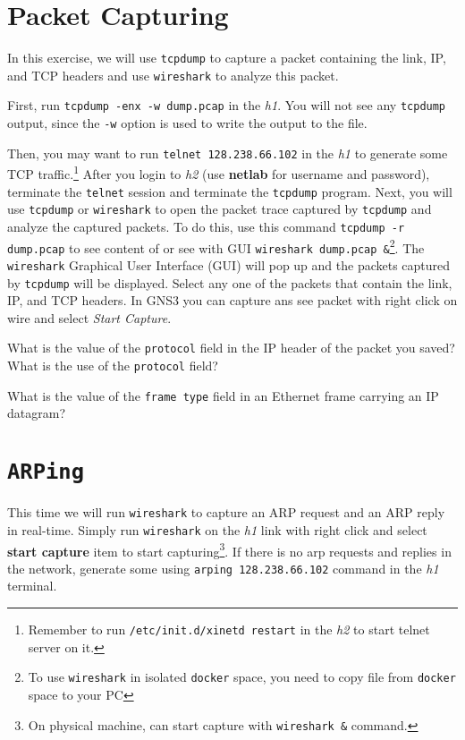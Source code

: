 \documentclass{../UTNetLab}
\begin{document}
\section{Packet Capturing}
    In this exercise, we will use \lstinline{tcpdump} to capture a packet containing the link, IP, and TCP headers and use \lstinline{wireshark} to analyze this packet.

    First, run \lstinline{tcpdump -enx -w dump.pcap} in the \textit{h1}.
    You will not see any \lstinline{tcpdump} output, since the \lstinline{-w} option is used to write the output to the  file.

    Then, you may want to run \lstinline{telnet 128.238.66.102} in the \textit{h1} to generate some TCP traffic.\footnote{Remember to run \lstinline{/etc/init.d/xinetd restart} in the \textit{h2} to start telnet server on it.}
    After you login to \textit{h2} (use \textbf{netlab} for username and password), terminate the \lstinline{telnet} session and terminate the \lstinline{tcpdump} program.
    Next, you will use \lstinline{tcpdump} or \lstinline{wireshark} to open the packet trace captured by \lstinline{tcpdump} and analyze the captured packets.
    To do this, use this command \lstinline{tcpdump -r dump.pcap} to see content of  or see with GUI \lstinline{wireshark dump.pcap &}\footnote{To use \lstinline{wireshark} in isolated \lstinline{docker} space, you need to copy file from  \lstinline{docker} space to your PC}.
    The \lstinline{wireshark} Graphical User Interface (GUI) will pop up and the packets captured by \lstinline{tcpdump} will be displayed.
    Select any one of the packets that contain the link, IP, and TCP headers.
    In GNS3 you can capture ans see packet with right click on wire and select \textit{Start Capture}.
    
    \begin{report}
        \item What is the value of the \texttt{protocol} field in the IP header of the packet you saved?
            What is the use of the \texttt{protocol} field?

        \item What is the value of the \texttt{frame type} field in an Ethernet frame carrying an IP datagram?
    \end{report}

\section{\texttt{ARPing}}
    This time we will run \lstinline{wireshark} to capture an ARP request and an ARP reply in real-time.
    Simply run \lstinline{wireshark} on the \textit{h1} link with right click and select \textbf{start capture} item to start capturing\footnote{On physical machine, can start capture with \lstinline{wireshark &} command.}.
    If there is no arp requests and replies in the network, generate some using \lstinline{arping 128.238.66.102} command in the \textit{h1} terminal.
\end{document}
